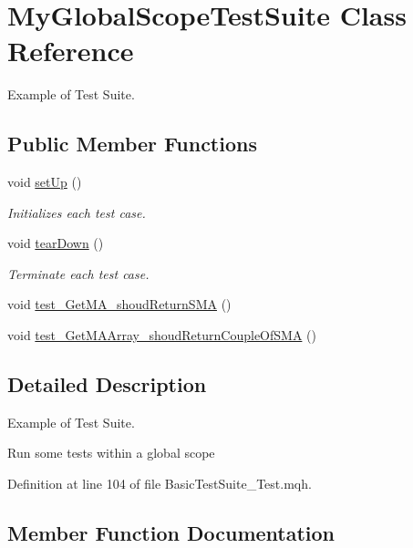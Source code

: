 \hypertarget{class_my_global_scope_test_suite}{}\section{My\+Global\+Scope\+Test\+Suite Class Reference}
\label{class_my_global_scope_test_suite}


Example of Test Suite.  


\subsection*{Public Member Functions}
\begin{DoxyCompactItemize}
\item 
void \mbox{\hyperlink{class_my_global_scope_test_suite_a21f7c76b6286f5f15cf047a5e396b17d}{set\+Up}} ()
\begin{DoxyCompactList}\small\item\em Initializes each test case. \end{DoxyCompactList}\item 
void \mbox{\hyperlink{class_my_global_scope_test_suite_aa99b3ed200fc5ff645509972190a4b29}{tear\+Down}} ()
\begin{DoxyCompactList}\small\item\em Terminate each test case. \end{DoxyCompactList}\item 
void \mbox{\hyperlink{class_my_global_scope_test_suite_a312549090f668135e117a8d6bb1160c0}{test\+\_\+\+Get\+M\+A\+\_\+shoud\+Return\+S\+MA}} ()
\item 
void \mbox{\hyperlink{class_my_global_scope_test_suite_a0b70c8c23cd8d6595cac8f6b7da3cc07}{test\+\_\+\+Get\+M\+A\+Array\+\_\+shoud\+Return\+Couple\+Of\+S\+MA}} ()
\end{DoxyCompactItemize}


\subsection{Detailed Description}
Example of Test Suite. 

Run some tests within a global scope 

Definition at line 104 of file Basic\+Test\+Suite\+\_\+\+Test.\+mqh.



\subsection{Member Function Documentation}
\mbox{\label{class_my_global_scope_test_suite_a21f7c76b6286f5f15cf047a5e396b17d}} 
